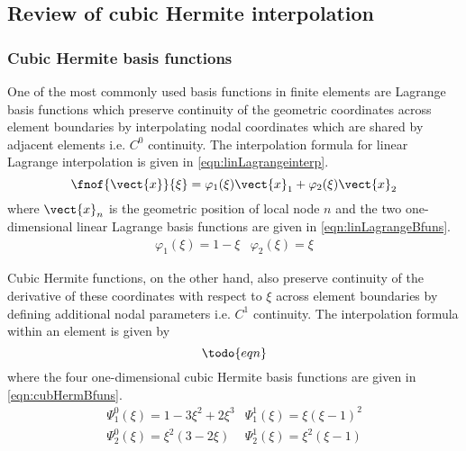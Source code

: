 \subsection{Review of cubic Hermite interpolation}

\subsubsection{Cubic Hermite basis functions}

One of the most commonly used basis functions in finite elements are Lagrange
basis functions which preserve continuity of the geometric coordinates across
element boundaries by interpolating nodal coordinates which are shared by
adjacent elements i.e.  $C^{0}$ continuity.  The interpolation formula for
linear Lagrange interpolation is given in \eqref{eqn:linLagrangeinterp}.
\begin{equation}
  \fnof{\vect{x}}{\xi}=\varphi_{1}(\xi)\vect{x}_{1}+\varphi_{2}(\xi)\vect{x}_{2}
  \label{eqn:linLagrangeinterp}
\end{equation}
where $\vect{x}_{n}$ is the geometric position of local node $n$ and the two
one-dimensional linear Lagrange basis functions are given in
\eqref{eqn:linLagrangeBfuns}.
\begin{eqnarray}
  \varphi_{1}(\xi)=1-\xi & \varphi_{2}(\xi)=\xi
  \label{eqn:linLagrangeBfuns}
\end{eqnarray}

Cubic Hermite functions, on the other hand, also preserve continuity of the
derivative of these coordinates with respect to $\xi$ across element
boundaries by defining additional nodal parameters 
i.e. $C^{1}$ continuity. The interpolation formula within an element is given
by
\begin{equation}
  \todo{eqn}
  \label{eqn:cubHermxiinterp}
\end{equation}
where the four one-dimensional cubic Hermite basis functions are given in 
\eqref{eqn:cubHermBfuns}.
\begin{eqnarray}
  \Psi_{1}^{0}(\xi)=1-3\xi^{2}+2\xi^{3} & \Psi_{1}^{1}(\xi)=\xi(\xi-1)^{2} 
  \nonumber \\
  \Psi_{2}^{0}(\xi)=\xi^{2}(3-2\xi) & \Psi_{2}^{1}(\xi)=\xi^{2}(\xi-1)
  \label{eqn:cubHermBfuns}
\end{eqnarray}

